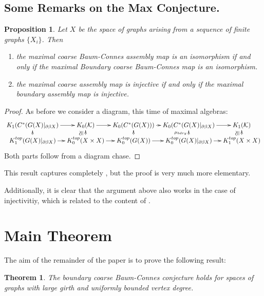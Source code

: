 \documentclass[11pt]{amsart}
\theoremstyle{plain}
\newtheorem{proposition}[theorem]{Proposition}%
\newtheorem*{thm}{Theorem}
\theoremstyle{definition}%
\theoremstyle{remark}%
\newcommand{\ucong}{\rotatebox{90}{$\cong$}}
\begin{document}
\subsection{Some Remarks on the Max Conjecture.}
\begin{proposition}\label{Prop:Max}
Let $X$ be the space of graphs arising from a sequence of finite graphs $\lbrace X_{i} \rbrace$. Then
\begin{enumerate}
\item the maximal coarse Baum-Connes assembly map is an isomorphism if and only if the maximal Boundary coarse Baum-Connes map is an isomorphism.
\item the maximal coarse assembly map is injective if and only if the maximal boundary assembly map is injective.
\end{enumerate}
\end{proposition}
\begin{proof}
As before we consider a diagram, this time of maximal algebras:
\begin{equation*}
\xymatrix@=0.7em{
K_{1}(C^{*}(G(X)|_{\partial\beta X}) \ar[r] & K_{0}(\mathcal{K}) \ar[r]& K_{0}(C^{*}(G(X))) \ar[r]& K_{0}(C^{*}(G(X)|_{\partial\beta X})\ar[r] & K_{1}(\mathcal{K})  \\
K_{1}^{top}(G(X)|_{\partial\beta X}) \ar[r] \ar[u]& K_{0}^{top}(X \times X) \ar[r]\ar[u]^{\ucong}& K_{0}^{top}(G(X)) \ar[r]\ar[u]& K_{0}^{top}(G(X)|_{\partial\beta X}) \ar[r]\ar[u]^{\mu_{bdry}}& K_{1}^{top}(X \times X)\ar[u]^{\ucong}
}
\end{equation*}
Both parts follow from a diagram chase.
\end{proof}


This result captures completely \cite[Corollary 4.18]{MR2568691}, but the proof is very much more elementary.

Additionally, it is clear that the argument above also works in the case of injectivitiy, which is related to the content of \cite[Theorem 5.1]{MR2431253}.

\section{Main Theorem}\label{Sect:MR}
The aim of the remainder of the paper is to prove the following result:
\begin{thm}
The boundary coarse Baum-Connes conjecture holds for spaces of graphs with large girth and uniformly bounded vertex degree.
\end{thm}
\end{document}
